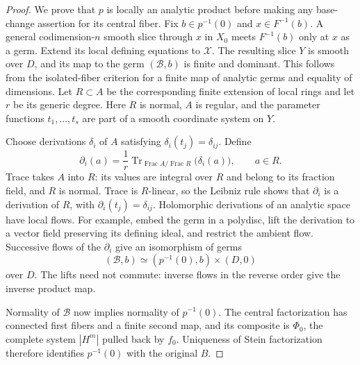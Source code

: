 \begin{proof}
We prove that $p$ is locally an analytic product before making any
base-change assertion for its central fiber.  Fix
$b\in p^{-1}(0)$ and $x\in F^{-1}(b)$.  A general codimension-$n$
smooth slice through $x$ in $X_0$ meets $F^{-1}(b)$ only at $x$
as a germ.  Extend its local defining equations to $\mathcal X$.
The resulting slice $Y$ is smooth over $D$, and its map to the germ
$(\mathcal B,b)$ is finite and dominant.  This follows from the
isolated-fiber criterion for a finite map of analytic germs and
equality of dimensions.  Let $R\subset A$ be the corresponding
finite extension of local rings and let $r$ be its generic degree.
Here $R$ is normal, $A$ is regular, and the parameter functions
$t_1,\ldots,t_s$ are part of a smooth coordinate system on $Y$.

Choose derivations $\delta_i$ of $A$ satisfying
$\delta_i(t_j)=\delta_{ij}$.  Define
\begin{equation}\label{def:trace-derivations}
 \partial_i(a)=\frac1r
       \operatorname{Tr}_{\operatorname{Frac}A/
                             \operatorname{Frac}R}
                    \bigl(\delta_i(a)\bigr),\qquad a\in R.
\end{equation}
Trace takes $A$ into $R$: its values are integral over $R$ and
belong to its fraction field, and $R$ is normal.  Trace is
$R$-linear, so the Leibniz rule shows that $\partial_i$ is a
derivation of $R$, with $\partial_i(t_j)=\delta_{ij}$.
Holomorphic derivations of an analytic space have local flows.
For example, embed the germ in a polydisc, lift the derivation to a
vector field preserving its defining ideal, and restrict the
ambient flow.  Successive flows of the $\partial_i$ give an
isomorphism of germs
\begin{equation}\label{def:base-local-product}
             (\mathcal B,b)\simeq(p^{-1}(0),b)\times(D,0)
\end{equation}
over $D$.  The lifts need not commute: inverse flows in the reverse
order give the inverse product map.

Normality of $\mathcal B$ now implies normality of $p^{-1}(0)$.
The central factorization has connected first fibers and a finite
second map, and its composite is $\Phi_0$, the complete system
$|H^m|$ pulled back by $f_0$.  Uniqueness of Stein factorization
therefore identifies $p^{-1}(0)$ with the original $B$.


\end{proof}
